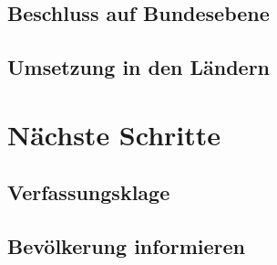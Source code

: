\documentclass[ignorenonframetext,ucs]{beamer}
\begin{document}
\subsection{Beschluss auf Bundesebene}

\subsection{Umsetzung in den Ländern}

\section{Nächste Schritte}

\subsection{Verfassungsklage}

\subsection{Bevölkerung informieren}
\end{document}
